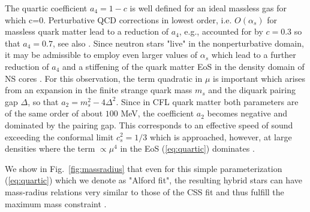 \documentclass[%
 reprint,
superscriptaddress,
nofootinbib,
 amsmath,amssymb,
 aps,
]{revtex4-1}
\begin{document}
The quartic coefficient $a_4=1-c$ is well defined for an ideal massless gas for which c=0. 
Perturbative QCD corrections in lowest order, i.e. $O(\alpha_s)$ for massless quark matter lead to a reduction of $a_4$, e.g., accounted for by $c=0.3$ so that $a_4=0.7$, see also \cite{Fraga:2001id}. Since neutron stars "live" in the nonperturbative domain, it may be admissible to employ even larger values of $\alpha_s$ which lead to a further reduction of $a_4$ and a stiffening of the quark matter EoS  in the density domain of NS cores \cite{Blaschke:2021poc}. 
For this observation, the term quadratic in $\mu$ is important which arises from an expansion in the finite strange quark mass $m_s$ and the diquark pairing gap
$\Delta$, so that $a_2 = m_s^2-4\Delta^2$. 
Since in CFL quark matter both parameters are of the same order of about $100$ MeV, the coefficient $a_2$ becomes negative and dominated by the pairing gap. This corresponds to an effective  speed of sound exceeding the conformal limit $c_s^2=1/3$ which is approached, however, at large densities where the term $\propto \mu^4$ in the EoS (\ref{eq:quartic}) dominates \cite{Alford:2004pf,Blaschke:2021poc}. 

We show in Fig.~\ref{fig:massradius} that even for this simple parameterization (\ref{eq:quartic}) which we denote as "Alford fit", the resulting hybrid stars can have mass-radius relations very similar to those of the CSS fit and thus fulfill the maximum mass constraint \cite{fonseca2021refined}.


\end{document}
